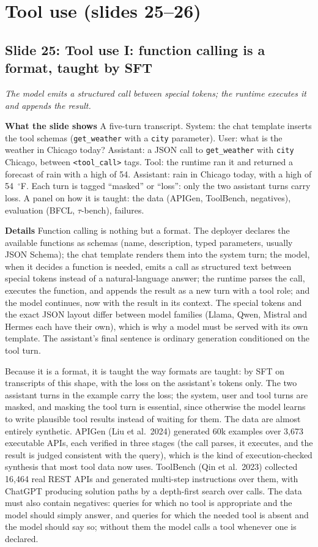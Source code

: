 \documentclass[11pt,letterpaper]{article}
\newcommand{\slide}[3]{%
  \subsection[Slide #1: #2]{Slide #1: #2}%
  {\color{muted}\itshape #3\par}\medskip}
\newcommand{\para}[1]{\medskip\noindent\textbf{#1}\quad}
\begin{document}
\section{Tool use (slides 25--26)}

\slide{25}{Tool use I: function calling is a format, taught by SFT}{The model emits a structured call between special tokens; the runtime executes it and appends the result.}

\para{What the slide shows} A five-turn transcript. System: the chat template inserts the tool schemas (\texttt{get\_weather} with a \texttt{city} parameter). User: what is the weather in Chicago today? Assistant: a JSON call to \texttt{get\_weather} with \texttt{city} Chicago, between \texttt{<tool\_call>} tags. Tool: the runtime ran it and returned a forecast of rain with a high of 54. Assistant: rain in Chicago today, with a high of 54~$^\circ$F. Each turn is tagged ``masked'' or ``loss'': only the two assistant turns carry loss. A panel on how it is taught: the data (APIGen, ToolBench, negatives), evaluation (BFCL, $\tau$-bench), failures.

\para{Details} Function calling is nothing but a format. The deployer declares the available functions as schemas (name, description, typed parameters, usually JSON Schema); the chat template renders them into the system turn; the model, when it decides a function is needed, emits a call as structured text between special tokens instead of a natural-language answer; the runtime parses the call, executes the function, and appends the result as a new turn with a tool role; and the model continues, now with the result in its context. The special tokens and the exact JSON layout differ between model families (Llama, Qwen, Mistral and Hermes each have their own), which is why a model must be served with its own template. The assistant's final sentence is ordinary generation conditioned on the tool turn.

Because it is a format, it is taught the way formats are taught: by SFT on transcripts of this shape, with the loss on the assistant's tokens only. The two assistant turns in the example carry the loss; the system, user and tool turns are masked, and masking the tool turn is essential, since otherwise the model learns to write plausible tool results instead of waiting for them. The data are almost entirely synthetic. APIGen (Liu et al.\ 2024) generated 60k examples over 3,673 executable APIs, each verified in three stages (the call parses, it executes, and the result is judged consistent with the query), which is the kind of execution-checked synthesis that most tool data now uses. ToolBench (Qin et al.\ 2023) collected 16,464 real REST APIs and generated multi-step instructions over them, with ChatGPT producing solution paths by a depth-first search over calls. The data must also contain negatives: queries for which no tool is appropriate and the model should simply answer, and queries for which the needed tool is absent and the model should say so; without them the model calls a tool whenever one is declared.
\end{document}
